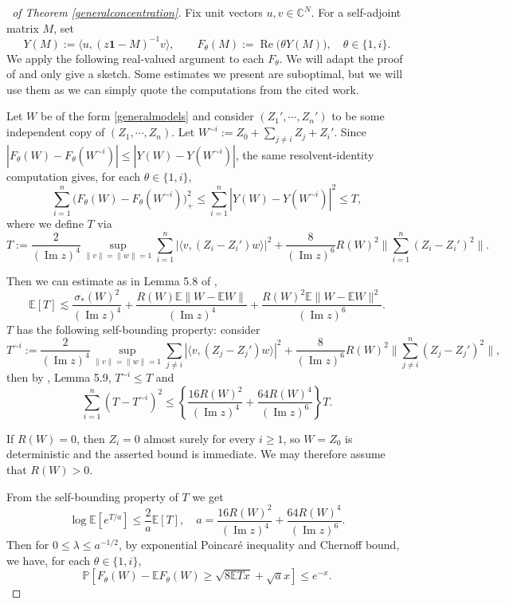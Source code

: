 \documentclass[11pt,reqno]{amsart}
\theoremstyle{plain}
\theoremstyle{remark}
\numberwithin{equation}{section}
\begin{document}
\begin{proof}[\proofname\ of Theorem \ref{generalconcentration}]
Fix unit vectors $u,v\in\mathbb{C}^N$. For a self-adjoint matrix $M$, set
\[
Y(M):=\langle u,(z\mathbf{1}-M)^{-1}v\rangle,\qquad
F_\theta(M):=\operatorname{Re}\bigl(\theta Y(M)\bigr),\quad \theta\in\{1,i\}.
\]
We apply the following real-valued argument to each $F_\theta$. We will adapt the proof of \cite{brailovskaya2022universality} and only give a sketch. Some estimates we present are suboptimal, but we will use them as we can simply quote the computations from the cited work. 


Let $W$ be of the form \eqref{generalmodels} and consider $(Z_1',\cdots,Z_n')$ to be some independent copy of $(Z_1,\cdots,Z_n)$. Let $W^{\sim i}:=Z_0+\sum_{j\neq i}Z_j+Z_i'$. Since
$|F_\theta(W)-F_\theta(W^{\sim i})|\leq |Y(W)-Y(W^{\sim i})|$, the same resolvent-identity computation gives, for each $\theta\in\{1,i\}$,
$$
\sum_{i=1}^n \bigl(F_\theta(W)-F_\theta(W^{\sim i})\bigr)_+^2
\leq \sum_{i=1}^n|Y(W)-Y(W^{\sim i})|^2\leq T,
$$where we define $T$ via
$$
T:=\frac{2}{(\operatorname{Im}z)^4}\sup_{\|v\|=\|w\|=1}\sum_{i=1}^n|\langle v,(Z_i-Z_i')w\rangle|^2+\frac{8}{(\operatorname{Im}z)^6}R(W)^2\|\sum_{i=1}^n(Z_i-Z_i')^2\|.
$$


Then we can estimate as in Lemma 5.8 of \cite{brailovskaya2022universality},
$$
\mathbb{E}[T]\lesssim \frac{\sigma_*(W)^2}{(\operatorname{Im}z)^4} +\frac{R(W)\mathbb{E}\|W-\mathbb{E}W\|}{(\operatorname{Im}z)^4}+\frac{R(W)^2\mathbb{E}\|W-\mathbb{E}W\|^2}{(\operatorname{Im}z)^6}.
$$ $T$ has the following self-bounding property: consider
$$
T^{\sim i}:=\frac{2}{(\operatorname{Im}z)^4}\sup_{\|v\|=\|w\|=1}\sum_{j\neq i}|\langle v,(Z_j-Z_j')w\rangle|^2+\frac{8}{(\operatorname{Im}z)^6}R(W)^2\|\sum_{j\neq i}^n(Z_j-Z_j')^2\|,
$$
    then by \cite{brailovskaya2022universality}, Lemma 5.9, $T^{\sim i}\leq T$ and 
    $$
\sum_{i=1}^n(T-T^{\sim i})^2\leq\left\{\frac{16R(W)^2}{(\operatorname{Im}z)^4}+\frac{64R(W)^4}{(\operatorname{Im}z)^6}\right\}T.
    $$

    If $R(W)=0$, then $Z_i=0$ almost surely for every $i\geq 1$, so $W=Z_0$ is deterministic and the asserted bound is immediate. We may therefore assume that $R(W)>0$.

    From the self-bounding property of $T$ we get $$ \log\mathbb{E}[e^{T/a}]\leq\frac{2}{a}\mathbb{E}[T],\quad a=\frac{16R(W)^2}{(\operatorname{Im}z)^4}+\frac{64R(W)^4}{(\operatorname{Im}z)^6}.
    $$
    Then for $0\leq\lambda\leq a^{-1/2}$, by exponential Poincaré inequality and Chernoff bound, we have, for each $\theta\in\{1,i\}$,
$$ \mathbb{P}\left[F_\theta(W)-\mathbb{E}F_\theta(W)\geq\sqrt{8\mathbb{E}Tx}+\sqrt{a}x
\right]\leq e^{-x}.
    $$


\end{proof}
\end{document}
